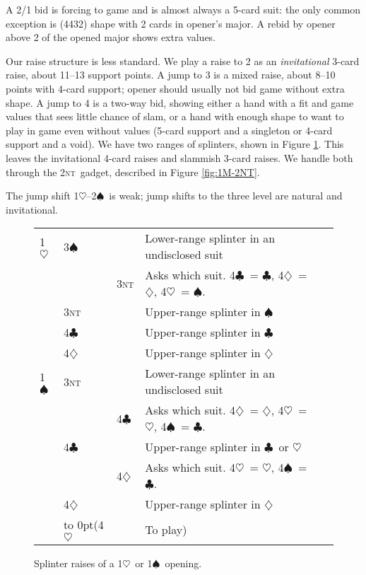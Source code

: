 \documentclass{report}
\renewcommand{\c}{\ensuremath{\clubsuit}}
\renewcommand{\d}{\ensuremath{\diamondsuit}}
\newcommand{\h}{\ensuremath{\heartsuit}}
\newcommand{\s}{\ensuremath{\spadesuit}}
\newcommand{\nt}{\textsc{nt}}
\newcommand{\+}{\ensuremath{^+}}
\begin{document}
A 2/1 bid is forcing to game and is almost always a 5-card suit: the
only common exception is (4432) shape with 2 cards in opener's major.
A rebid by opener above 2 of the opened major shows extra values.

Our raise structure is less standard.  We play a raise to 2 as an
\emph{invitational} 3-card raise, about 11--13 support points.  A jump
to 3 is a mixed raise, about 8--10 points with 4-card support; opener
should usually not bid game without extra shape.  A jump to 4 is a
two-way bid, showing either a hand with a fit and game values that
sees little chance of slam, or a hand with enough shape to want to
play in game even without values (5-card support and a singleton or
4-card support and a void).  We have two ranges of splinters, shown in
Figure \ref{fig:1M-splinters}.  This leaves the invitational 4-card
raises and slammish 3-card raises.  We handle both through the
2\nt\ gadget, described in Figure \ref{fig:1M-2NT}.

The jump shift 1\h--2\s\ is weak; jump shifts to the three level are
natural and invitational.

\begin{figure}
\begin{center}
\begin{tabular}{lllll}
1\h
&3\s &&Lower-range splinter in an undisclosed suit\\
&    &3\nt&Asks which suit.  4\c\ = \c, 4\d\ = \d, 4\h\ = \s.\\
&3\nt&&Upper-range splinter in \s\\
&4\c &&Upper-range splinter in \c\\
&4\d &&Upper-range splinter in \d\\
1\s
&3\nt&&Lower-range splinter in an undisclosed suit\\
&    &4\c&Asks which suit.  4\d\ = \d, 4\h\ = \h, 4\s\ = \c.\\
&4\c &&Upper-range splinter in \c\ or \h\\
&    &4\d&Asks which suit.  4\h\ = \h, 4\s\ = \c.\\
&4\d &&Upper-range splinter in \d\\
&\hbox to 0pt{\hss(}4\h&&To play)\\
\end{tabular}
\end{center}
\caption{\label{fig:1M-splinters}Splinter raises of a 1\h\ or 1\s\ opening.}
\end{figure}
\end{document}
